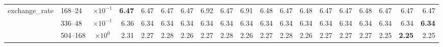 \begin{table}[htbp]
{\begin{tabular}{llcrrrrrrrrrrrrrrrr}
\midrule
\multirow{3}{*}{exchange\_rate} & 168--24 & $\times 10^{-1}$ & \textbf{6.47} & 6.47 & 6.47 & 6.47 & 6.92 & 6.47 & 6.91 & 6.48 & 6.47 & 6.48 & 6.47 & 6.47 & 6.48 & 6.47 & 6.47 & 6.47 \\
 & 336--48 & $\times 10^{-1}$ & 6.36 & 6.34 & 6.34 & 6.34 & 6.34 & 6.34 & 6.34 & 6.34 & 6.34 & 6.34 & 6.34 & 6.34 & 6.34 & 6.34 & 6.34 & \textbf{6.34} \\
 & 504--168 & $\times 10^{0}$ & 2.31 & 2.27 & 2.28 & 2.26 & 2.27 & 2.28 & 2.26 & 2.27 & 2.28 & 2.26 & 2.27 & 2.27 & 2.27 & 2.25 & \textbf{2.25} & 2.25 \\
\bottomrule
\end{tabular}%
}
\label{tab:baselines-results}
\end{table}
